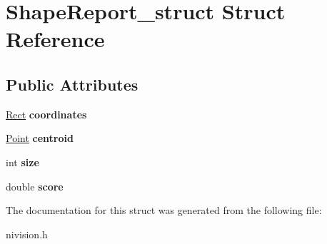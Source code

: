 \hypertarget{structShapeReport__struct}{\section{\-Shape\-Report\-\_\-struct \-Struct \-Reference}
\label{structShapeReport__struct}
}
\subsection*{\-Public \-Attributes}
\begin{DoxyCompactItemize}
\item 
\hypertarget{structShapeReport__struct_accf2b07cae49dd5fc5c8b84e17ddad33}{\hyperlink{structRect__struct}{\-Rect} {\bfseries coordinates}}\label{structShapeReport__struct_accf2b07cae49dd5fc5c8b84e17ddad33}

\item 
\hypertarget{structShapeReport__struct_ada0450e538b571313e1a11dd8d54fbd7}{\hyperlink{structPoint__struct}{\-Point} {\bfseries centroid}}\label{structShapeReport__struct_ada0450e538b571313e1a11dd8d54fbd7}

\item 
\hypertarget{structShapeReport__struct_a7f90343d62d2b0d8cfa40b4f72195080}{int {\bfseries size}}\label{structShapeReport__struct_a7f90343d62d2b0d8cfa40b4f72195080}

\item 
\hypertarget{structShapeReport__struct_ab11eee47b74892f093500665fa120cdc}{double {\bfseries score}}\label{structShapeReport__struct_ab11eee47b74892f093500665fa120cdc}

\end{DoxyCompactItemize}


\-The documentation for this struct was generated from the following file\-:\begin{DoxyCompactItemize}
\item 
nivision.\-h\end{DoxyCompactItemize}
